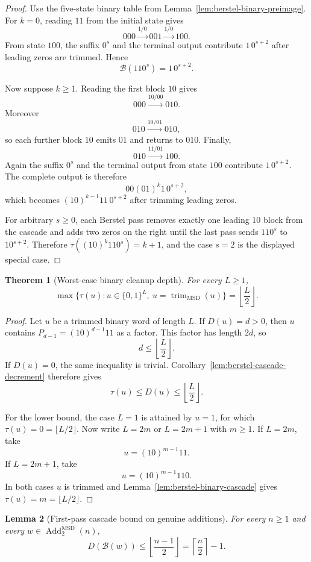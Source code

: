 \documentclass[11pt,letterpaper]{article}
\numberwithin{equation}{section}
\theoremstyle{plain}
\newtheorem{theorem}{Theorem}[section]
\newtheorem{lemma}[theorem]{Lemma}
\theoremstyle{definition}
\theoremstyle{remark}
\newcommand{\AddTwo}{\operatorname{Add}_{2}}
\newcommand{\Berstel}{\mathcal{B}}
\newcommand{\trimMSD}{\operatorname{trim}_{\mathrm{MSD}}}
\begin{document}
\begin{proof}
Use the five-state binary table from Lemma~\ref{lem:berstel-binary-preimage}.
For $k=0$, reading $11$ from the initial state gives
\[
000\xrightarrow{1/0}001\xrightarrow{1/0}100.
\]
From state $100$, the suffix $0^s$ and the terminal output contribute
$1\,0^{s+2}$ after leading zeros are trimmed.  Hence
\[
\Berstel(110^s)=1\,0^{s+2}.
\]

Now suppose $k\ge 1$.  Reading the first block $10$ gives
\[
000\xrightarrow{10/00}010.
\]
Moreover
\[
010\xrightarrow{10/01}010,
\]
so each further block $10$ emits $01$ and returns to $010$.  Finally,
\[
010\xrightarrow{11/01}100.
\]
Again the suffix $0^s$ and the terminal output from state $100$ contribute
$1\,0^{s+2}$.  The complete output is therefore
\[
00(01)^k1\,0^{s+2},
\]
which becomes $(10)^{k-1}11\,0^{s+2}$ after trimming leading zeros.

For arbitrary $s\ge 0$, each Berstel pass removes exactly one leading $10$
block from the cascade and adds two zeros on the right until the last pass
sends $110^s$ to $10^{s+2}$.  Therefore
$\tau((10)^k110^s)=k+1$, and the case $s=2$ is the displayed special case.
\end{proof}

\begin{theorem}[Worst-case binary cleanup depth]\label{thm:berstel-binary-worst-case}
For every $L\ge 1$,
\[
\max\{\tau(u):u\in\{0,1\}^L,\ u=\trimMSD(u)\}
=
\left\lfloor\frac L2\right\rfloor .
\]
\end{theorem}

\begin{proof}
Let $u$ be a trimmed binary word of length $L$.  If $D(u)=d>0$, then $u$
contains $P_{d-1}=(10)^{d-1}11$ as a factor.  This factor has length $2d$, so
\[
d\le \left\lfloor\frac L2\right\rfloor.
\]
If $D(u)=0$, the same inequality is trivial.  Corollary~\ref{lem:berstel-cascade-decrement}
therefore gives
\[
\tau(u)\le D(u)\le \left\lfloor\frac L2\right\rfloor.
\]

For the lower bound, the case $L=1$ is attained by $u=1$, for which
$\tau(u)=0=\lfloor L/2\rfloor$.  Now write $L=2m$ or $L=2m+1$ with $m\ge 1$.
If $L=2m$, take
\[
u=(10)^{m-1}11.
\]
If $L=2m+1$, take
\[
u=(10)^{m-1}110.
\]
In both cases $u$ is trimmed and Lemma~\ref{lem:berstel-binary-cascade} gives
$\tau(u)=m=\lfloor L/2\rfloor$.
\end{proof}

\begin{lemma}[First-pass cascade bound on genuine additions]\label{lem:berstel-first-pass-cascade}
For every $n\ge 1$ and every $w\in\AddTwo^{\mathrm{MSD}}(n)$,
\[
D(\Berstel(w))\le
\left\lfloor\frac{n-1}{2}\right\rfloor
=
\left\lceil\frac n2\right\rceil-1.
\]
\end{lemma}
\end{document}
